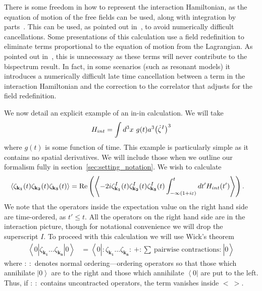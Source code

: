 There is some freedom in how to represent the interaction Hamiltonian,
as the equation of motion of the free fields can be used, along with integration by parts~\cite{rp_integ_by_parts}.
This can be used, as pointed out in~\cite{Funakoshi}, to avoid numerically difficult cancellations.
Some presentations of this calculation use a field redefinition to eliminate terms
proportional to the equation of motion from the Lagrangian.
As pointed out in~\cite{px_burrage},
this is unnecessary as these terms will never contribute to the bispectrum result.
In fact, in some scenarios (such as resonant models) it introduces a numerically difficult
late time cancellation between a term in the interaction Hamiltonian and the
correction to the correlator that adjusts for the field redefinition.




We now detail an explicit example of an in-in calculation.
We will take
\begin{align}\label{hint_example}
    H_{int}=\int d^3x~g(t) a^3{\left(\dot{\zeta}^I\right)^3}
\end{align}
where $g(t)$ is some function of time.
This example is particularly simple as it contains no spatial derivatives.
We will include those when we outline our formalism fully in section~\ref{sec:setting_notation}.
We wish to calculate
\begin{align}\label{inin_example}
    \left<\zeta_{\mathbf{k_1}}(t)\zeta_{\mathbf{k_2}}(t)\zeta_{\mathbf{k_3}}(t)\right>&=
    \operatorname{Re}\left(\left<-2i \zeta^I_{\mathbf{k_1}}(t)\zeta^I_{\mathbf{k_2}}(t)\zeta^I_{\mathbf{k_3}}(t)
    \int_{-\infty(1+i\varepsilon)}^{t}dt'H_{int}(t')
    \right>\right).
\end{align}
We note that the operators inside the expectation value on the right hand side are
time-ordered, as $t'\leq t$.
All the operators on the right hand side are in the interaction picture, though for
notational convenience we will drop the superscript $I$.
To proceed with this calculation we will use Wick's theorem
\begin{align}\label{wick}
    \left<0\left|\zeta_{\mathbf{k_1}}\ldots\zeta_{\mathbf{k_n}}\right|0\right>
    &= \left<0\left|:\zeta_{\mathbf{k_1}}\ldots\zeta_{\mathbf{k_n}}:~+:\sum~\text{pairwise contractions:}~\right|0\right>
\end{align}
where $:~:$ denotes normal ordering---ordering operators so that those
which annihilate $\left|0\right>$ are to the right and those which annihilate
$\left<0\right|$ are put to the left. Thus, if $:~:$ contains uncontracted
operators, the term vanishes inside $<~>$.


